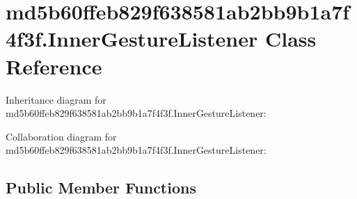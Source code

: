 \hypertarget{classmd5b60ffeb829f638581ab2bb9b1a7f4f3f_1_1_inner_gesture_listener}{}\section{md5b60ffeb829f638581ab2bb9b1a7f4f3f.\+Inner\+Gesture\+Listener Class Reference}
\label{classmd5b60ffeb829f638581ab2bb9b1a7f4f3f_1_1_inner_gesture_listener}


Inheritance diagram for md5b60ffeb829f638581ab2bb9b1a7f4f3f.\+Inner\+Gesture\+Listener\+:


Collaboration diagram for md5b60ffeb829f638581ab2bb9b1a7f4f3f.\+Inner\+Gesture\+Listener\+:
\subsection*{Public Member Functions}
